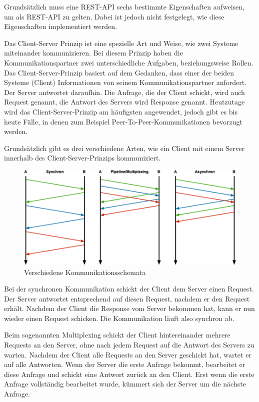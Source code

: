 
Grundsätzlich muss eine REST-API sechs bestimmte Eigenschaften aufweisen, um als REST-API zu gelten. Dabei ist jedoch nicht festgelegt, wie diese Eigenschaften implementiert werden. \cite{RedHatRest}


Das Client-Server Prinzip ist eine spezielle Art und Weise, wie zwei Systeme miteinander kommunizieren. Bei diesem Prinzip haben die Kommunikationspartner zwei unterschiedliche Aufgaben, beziehungsweise Rollen. Das Client-Server-Prinzip basiert auf dem Gedanken, dass einer der beiden Systeme (Client) Informationen von seinem Kommunikationspartner anfordert. Der Server antwortet daraufhin. Die Anfrage, die der Client schickt, wird auch Request genannt, die Antwort des Servers wird Response genannt. Heutzutage wird das Client-Server-Prinzip am häufigsten angewendet, jedoch gibt es bis heute Fälle, in denen zum Beispiel Peer-To-Peer-Kommunikationen bevorzugt werden.

Grundsätzlich gibt es drei verschiedene Arten, wie ein Client mit einem Server innerhalb des Client-Server-Prinzips kommuniziert. 

\begin{figure}[H]
    \centering
    \includegraphics{media/REST/ClientServer.png}
    \caption{Verschiedene Kommunikationsschemata \cite{ClientServer}}
\end{figure}

Bei der synchronen Kommunikation schickt der Client dem Server einen Request. Der Server antwortet entsprechend auf diesen Request, nachdem er den Request erhält. Nachdem der Client die Response vom Server bekommen hat, kann er nun wieder einen Request schicken. Die Kommunikation läuft also synchron ab.

Beim sogenannten Multiplexing schickt der Client hintereinander mehrere Requests an den Server, ohne nach jedem Request auf die Antwort des Servers zu warten. Nachdem der Client alle Requests an den Server geschickt hat, wartet er auf alle Antworten. Wenn der Server die erste Anfrage bekommt, bearbeitet er diese Anfrage und schickt eine Antwort zurück an den Client. Erst wenn die erste Anfrage vollständig bearbeitet wurde, kümmert sich der Server um die nächste Anfrage.

